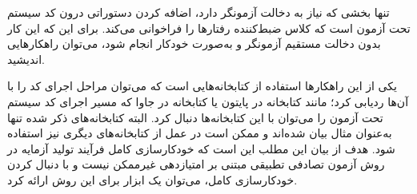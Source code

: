 تنها بخشی که نیاز به دخالت آزمونگر دارد، اضافه کردن دستوراتی درون کد سیستم تحت آزمون است که کلاس ضبط‌کننده رفتارها را فراخوانی می‌کند. برای این که این کار بدون دخالت مستقیم آزمونگر و به‌صورت خودکار انجام شود، می‌توان راهکارهایی اندیشید.

یکی از این راهکارها استفاده از کتابخانه‌هایی است که می‌توان مراحل اجرای کد را با آن‌ها ردیابی کرد؛ مانند کتابخانه  در پایتون یا کتابخانه  در جاوا که مسیر اجرای کد سیستم تحت آزمون را می‌توان با این کتابخانه‌ها دنبال کرد. البته کتابخانه‌های ذکر شده تنها به‌عنوان مثال بیان شده‌اند و ممکن است در عمل از کتابخانه‌های دیگری نیز استفاده شود. هدف از بیان این مطلب این است که خودکارسازی کامل فرآیند تولید آزمایه در روش آزمون تصادفی تطبیقی مبتنی بر امتیازدهی غیرممکن نیست و با دنبال کردن خودکارسازی کامل، می‌توان یک ابزار برای این روش ارائه کرد.



